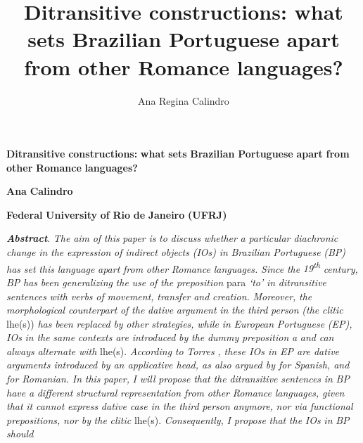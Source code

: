 \documentclass[output=paper,modfonts,nonflat]{langsci/langscibook}
\author{Ana Regina Calindro\affiliation{}}
\title{Ditransitive constructions: what sets Brazilian Portuguese apart from other Romance languages?}
\begin{document}
\maketitle 


\textbf{Ditransitive} \textbf{constructions:} \textbf{what} \textbf{sets} \textbf{Brazilian} \textbf{Portuguese} \textbf{apart} \textbf{from} \textbf{other} \textbf{Romance} \textbf{languages?}

\textbf{Ana} \textbf{Calindro}

\textbf{Federal} \textbf{University} \textbf{of} \textbf{Rio} \textbf{de} \textbf{Janeiro} \textbf{(UFRJ)}

\textbf{\textit{Abstract}}. \textit{The} \textit{aim} \textit{of} \textit{this} \textit{paper} \textit{is} \textit{to} \textit{discuss} \textit{whether} \textit{a} \textit{particular} \textit{diachronic} \textit{change} \textit{in} \textit{the} \textit{expression} \textit{of} \textit{indirect} \textit{objects} \textit{(IOs)} \textit{in} \textit{Brazilian} \textit{Portuguese} \textit{(BP)} \textit{has} \textit{set} \textit{this} \textit{language} \textit{apart} \textit{from} \textit{other} \textit{Romance} \textit{languages.} \textit{Since} \textit{the} \textit{19\textsuperscript{th}} \textit{century,} \textit{BP} \textit{has} \textit{been} \textit{generalizing} \textit{the} \textit{use} \textit{of} \textit{the} \textit{preposition} para \textit{‘to’} \textit{in} \textit{ditransitive} \textit{sentences} \textit{with} \textit{verbs} \textit{of} \textit{movement,} \textit{transfer} \textit{and} \textit{creation.} \textit{Moreover,} \textit{the} \textit{morphological} \textit{counterpart} \textit{of} \textit{the} \textit{dative} \textit{argument} \textit{in} \textit{the} \textit{third} \textit{person} \textit{(the} \textit{clitic} lhe(s)) \textit{has} \textit{been} \textit{replaced} \textit{by} \textit{other} \textit{strategies,} \textit{while} \textit{in} \textit{European} \textit{Portuguese} \textit{(EP),} \textit{IOs} \textit{in} \textit{the} \textit{same} \textit{contexts} \textit{are} \textit{introduced} \textit{by} \textit{the} \textit{dummy} \textit{preposition} \textit{a} \textit{and} \textit{can} \textit{always} \textit{alternate} \textit{with} lhe(s). \textit{According} \textit{to} \textit{Torres} \textit{\citet{Morais2007}, these IOs in EP are dative arguments introduced by an applicative head, as also argued by \citet{Cuervo2003} for Spanish, and \citet{DiaconescuRivero2007} for Romanian.}\textbf{ }\textit{In} \textit{this} \textit{paper,} \textit{I} \textit{will} \textit{propose} \textit{that} \textit{the} \textit{ditransitive} \textit{sentences} \textit{in} \textit{BP} \textit{have} \textit{a} \textit{different} \textit{structural} \textit{representation} \textit{from} \textit{other} \textit{Romance} \textit{languages,} \textit{given} \textit{that} \textit{it} \textit{cannot} \textit{express} \textit{dative} \textit{case} \textit{in} \textit{the} \textit{third} \textit{person} \textit{anymore,} \textit{nor} \textit{via} \textit{functional} \textit{prepositions,} \textit{nor} \textit{by} \textit{the} \textit{clitic} lhe(s). \textit{Consequently,} \textit{I} \textit{propose} \textit{that} \textit{the} \textit{IOs} \textit{in} \textit{BP} \textit{should} 
\end{document}
